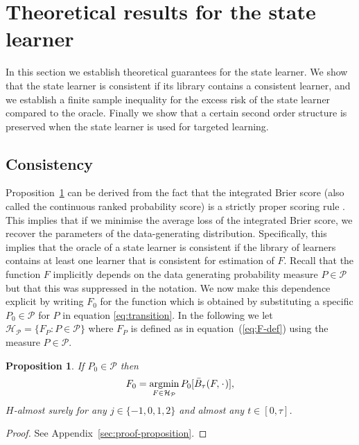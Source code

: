 \documentclass{statsoc}
\newtheorem{proposition}{Proposition}
\DeclareMathOperator{\E}{\mathbb{E}} %
\newcommand{\blank}{\makebox[1ex]{\textbf{$\cdot$}}}
\renewcommand{\phi}{\varphi}
\newcommand{\1}{\mathds{1}}
\DeclareMathOperator*{\argmin}{\arg\!\min}
\begin{document}
\section{Theoretical results for the state learner}
\label{sec:theor-results-prop}

In this section we establish theoretical guarantees for the state learner. We
show that the state learner is consistent if its library contains a consistent
learner, and we establish a finite sample inequality for the excess risk of the
state learner compared to the oracle. Finally we show that a certain second
order structure is preserved when the state learner is used for targeted
learning.

\subsection{Consistency}
\label{sec:consistency}

Proposition~\ref{prop:stric-prop} can be derived from the fact that the
integrated Brier score (also called the continuous ranked probability score) is
a strictly proper scoring rule \citep{gneiting2007strictly}. This implies that
if we minimise the average loss of the integrated Brier score, we recover the
parameters of the data-generating distribution. Specifically, this implies that
the oracle of a state learner is consistent if the library of learners contains
at least one learner that is consistent for estimation of \( F \). Recall that
the function \(F\) implicitly depends on the data generating probability measure
\(P\in\mathcal P\) but that this was suppressed in the notation. We now make
this dependence explicit by writing \(F_0\) for the function which is obtained
by substituting a specific \(P_0\in\mathcal{P}\) for \(P\) in equation
\eqref{eq:transition}. In the following we let
\( \mathcal{H}_{\mathcal{P}} = \{F_P : P \in \mathcal{P}\} \) where \( F_P \) is defined as in
equation~(\ref{eq:F-def}) using the measure \( P \in \mathcal{P} \).

\begin{proposition}
  \label{prop:stric-prop}
  If \(P_0\in\mathcal{P}\) then
  \begin{equation*}
    F_0 = \argmin_{F \in \mathcal{H}_{\mathcal{P}}} P_0{[\bar{B}_\tau(F, \blank)]},
  \end{equation*}
  \( H \)-almost surely for any \( j\in \{-1,0,1,2\} \) and almost any
  \( t \in [0, \tau]\).
\end{proposition}
\begin{proof}
  See Appendix~\ref{sec:proof-proposition}.
\end{proof}
\end{document}
